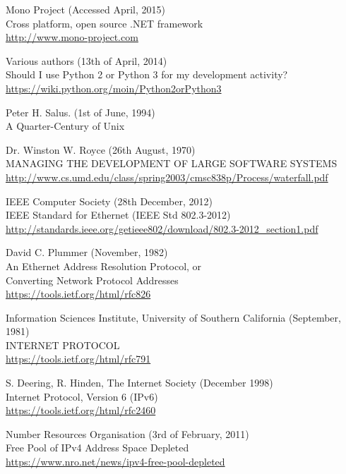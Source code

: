 \documentclass[10pt,a4paper,notitlepage]{report}
\begin{document}
\begin{thebibliography}{99}
	Mono Project (Accessed April, 2015)\\
	Cross platform, open source .NET framework\\
	\url{http://www.mono-project.com}

    Various authors (13th of April, 2014)\\
    Should I use Python 2 or Python 3 for my development activity?\\
    \url{https://wiki.python.org/moin/Python2orPython3}

    Peter H. Salus. (1st of June, 1994)\\
    A Quarter-Century of Unix

    Dr. Winston W. Royce (26th August, 1970)\\
    MANAGING THE DEVELOPMENT OF LARGE SOFTWARE SYSTEMS\\
    \url{http://www.cs.umd.edu/class/spring2003/cmsc838p/Process/waterfall.pdf}
    
	IEEE Computer Society (28th December, 2012)\\
	IEEE Standard for Ethernet (IEEE Std 802.3-2012)\\
	\url{http://standards.ieee.org/getieee802/download/802.3-2012_section1.pdf}
	
	David C. Plummer (November, 1982)\\
	An Ethernet Address Resolution Protocol, or\\
	Converting Network Protocol Addresses\\
	\url{https://tools.ietf.org/html/rfc826}
	
	Information Sciences Institute, University of Southern California (September, 1981)\\
	INTERNET PROTOCOL\\
	\url{https://tools.ietf.org/html/rfc791}
	
	S. Deering, R. Hinden, The Internet Society (December 1998)\\
	Internet Protocol, Version 6 (IPv6)\\
	\url{https://tools.ietf.org/html/rfc2460}

	Number Resources Organisation (3rd of February, 2011)\\
	Free Pool of IPv4 Address Space Depleted\\
	\url{https://www.nro.net/news/ipv4-free-pool-depleted}


\end{thebibliography}
\end{document}
